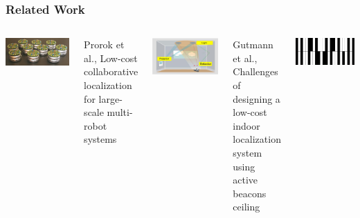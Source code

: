 \documentclass[lualatex,aspectratio=169,xcolor=dvipsnames,10pt,c]{beamer}
\begin{document}
\frame
{
	\frametitle{Related Work}
	
	\begin{columns}
	\includegraphics[width=.9\columnwidth]{prorok-robots}
	
	\footnotesize{Prorok et al., Low-cost collaborative localization for large-scale multi-robot systems}
	
	\vspace{1em}

	\includegraphics[width=.9\columnwidth]{gutmann-detector}
	
	\footnotesize{Gutmann et al., Challenges of designing a low-cost indoor localization system using active beacons ceiling}
	
	
	\includegraphics[width=.9\columnwidth]{dias-barcode}
	

\end{columns}}
\end{document}
